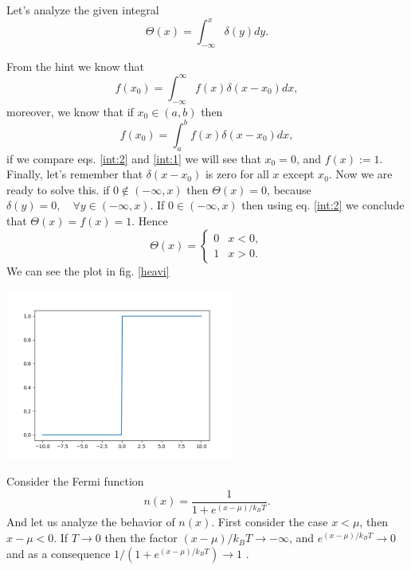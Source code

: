 \begin{questions}
\begin{solution}
  Let's analyze the given integral
  \begin{equation}
    \Theta(x) = \int_{-\infty}^x \delta(y)dy.
    \label{int:1}
  \end{equation}

  From the hint we know that
  \begin{equation}
    f(x_0) = \int_{-\infty}^\infty f(x)\delta(x-x_0)dx,
  \end{equation}
  moreover, we know that if $x_0 \in (a,b)$ then
  \begin{equation}
    f(x_0) = \int_{a}^b f(x)\delta(x-x_0)dx,
    \label{int:2}
  \end{equation}
  if we compare eqs. \ref{int:2} and \ref{int:1} we will see that $x_0 = 0$, and $f(x) := 1$. Finally, let's remember that $\delta(x-x_0)$ is zero for all $x$ except $x_0$. Now we are ready to solve this.
  if $0\notin(-\infty,x)$ then $\Theta(x) = 0$, because $\delta(y)=0, \quad \forall y\in(-\infty,x)$. If $0\in(-\infty,x)$ then using eq. \ref{int:2} we conclude that $\Theta(x) = f(x) = 1$. Hence
  \begin{equation}
    \Theta(x) =
    \begin{cases}
      0 & x<0, \\
      1 & x>0.
   \end{cases}
  \end{equation}
  We can see the plot in fig. \ref{heavi}

\begin{center}
  \includegraphics[width=75mm]{heavi}
\end{center}
   \label{heavi}\vspace{0.5cm}
\end{solution}

\begin{solution}
  Consider the Fermi function
  \begin{equation}
    n(x) = \frac{1}{1+ e^{(x-\mu)/k_B T}}.
    \label{ferm}
  \end{equation}
  And let us analyze the behavior of $n(x)$. First consider the case $x<\mu$, then $x-\mu < 0$. If $T\rightarrow0$ then the factor $(x-\mu)/k_B T \rightarrow - \infty$, and $e^{(x-\mu)/k_B T} \rightarrow 0$ and as a consequence $1/(1+ e^{(x-\mu)/k_B T}) \rightarrow 1$ .


\end{solution}
\end{questions}
